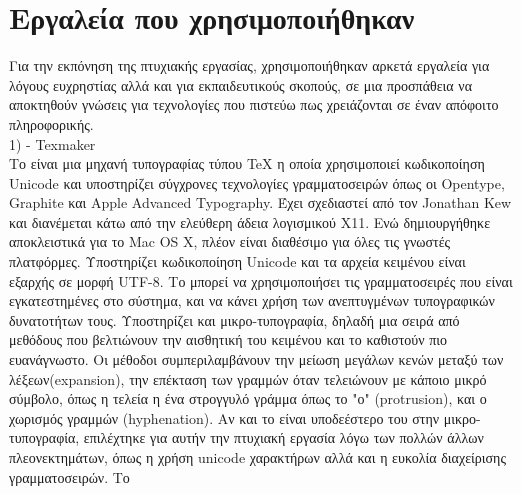 \section{Εργαλεία που χρησιμοποιήθηκαν}

Για την εκπόνηση της πτυχιακής εργασίας, χρησιμοποιήθηκαν αρκετά εργαλεία για λόγους ευχρηστίας αλλά και για εκπαιδευτικούς σκοπούς, σε μια προσπάθεια να αποκτηθούν γνώσεις για τεχνολογίες που πιστεύω πως χρειάζονται σε έναν απόφοιτο πληροφορικής.\\
1)  - Texmaker\\
Το  είναι μια μηχανή τυπογραφίας τύπου TeX η οποία χρησιμοποιεί κωδικοποίηση Unicode και υποστηρίζει σύγχρονες τεχνολογίες γραμματοσειρών όπως οι Opentype, Graphite και Apple Advanced Typography. Έχει σχεδιαστεί από τον Jonathan Kew και διανέμεται κάτω από την ελεύθερη άδεια λογισμικού X11. Ενώ δημιουργήθηκε αποκλειστικά για το Mac OS X, πλέον είναι διαθέσιμο για όλες τις γνωστές πλατφόρμες. Υποστηρίζει κωδικοποίηση Unicode και τα αρχεία κειμένου είναι εξαρχής σε μορφή UTF-8. Το  μπορεί να χρησιμοποιήσει τις γραμματοσειρές που είναι εγκατεστημένες στο σύστημα, και να κάνει χρήση των ανεπτυγμένων τυπογραφικών δυνατοτήτων τους. Υποστηρίζει και μικρο-τυπογραφία, δηλαδή μια σειρά από μεθόδους που βελτιώνουν την αισθητική του κειμένου και το καθιστούν πιο ευανάγνωστο. Οι μέθοδοι συμπεριλαμβάνουν την μείωση μεγάλων κενών μεταξύ των λέξεων(expansion), την επέκταση των γραμμών όταν τελειώνουν με κάποιο μικρό σύμβολο, όπως η τελεία η ένα στρογγυλό γράμμα όπως το "ο" (protrusion), και ο χωρισμός γραμμών (hyphenation). Αν και το  είναι υποδεέστερο του  στην μικρο-τυπογραφία, επιλέχτηκε για αυτήν την πτυχιακή εργασία λόγω των πολλών άλλων πλεονεκτημάτων, όπως η χρήση unicode χαρακτήρων αλλά και η ευκολία διαχείρισης γραμματοσειρών. Το  

